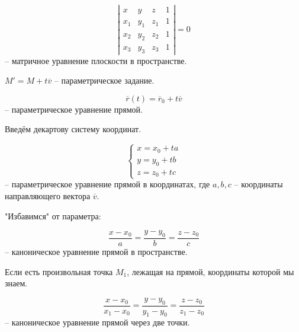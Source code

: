 	\begin{Def}
		$$\left|\begin{array}{cccc}
			x & y & z & 1 \\ 
			x_1 & y_1 & z_1 & 1 \\
			x_2 & y_2 & z_2 & 1 \\
			x_3 & y_3 & z_3 & 1 
			\end{array}\right| = 0$$ -- матричное уравнение плоскости в пространстве.
	\end{Def}


	\begin{Def}
		$M' = M + t \overline{v}$ -- параметрическое задание. 
	\end{Def}
	
	\begin{Def}
		$$\overline{r}(t) = \overline{r}_0 + t \overline{v}$$ -- параметрическое уравнение прямой.
	\end{Def}

	Введём декартову систему координат.

	\begin{figure}[h]
		\centering
		\def\svgwidth{0.25\columnwidth}
		
	\end{figure}

	\begin{Def}
		$$ \begin{cases}
			x = x_0 + ta\\
			y = y_0 + tb \\
			z = z_0 + tc
		\end{cases} $$ -- параметрическое уравнение прямой в координатах, где $a, b, c$ -- координаты направляющего вектора $\overline{v}$.
	\end{Def}

	"Избавимся" от параметра: 
	\begin{Def}
		$$\frac{x - x_0}{a} = \frac{y - y_0}{b} = \frac{z - z_0}{c}$$ -- каноническое уравнение прямой в пространстве.
	\end{Def}
	
	Если есть произвольная точка $M_1$, лежащая на прямой, координаты которой мы знаем.

	\begin{Def}
		$$\frac{x - x_0}{x_1 - x_0} = \frac{y - y_0}{y_1 - y_0} = \frac{z - z_0}{z_1 - z_0}$$ -- каноническое уравнение прямой через две точки.
	\end{Def}

